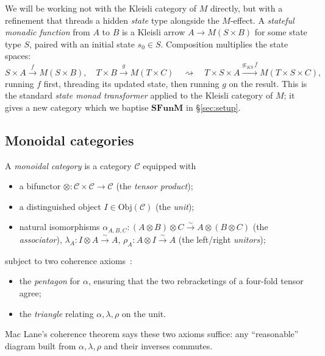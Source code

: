 \documentclass[11pt]{article}
\newcommand{\SFunM}{\mathbf{SFunM}}
\newcommand{\Obj}{\mathrm{Obj}}
\begin{document}
We will be working not with the Kleisli category of $M$ directly, but
with a refinement that threads a hidden \emph{state} type alongside
the $M$-effect.  A \emph{stateful monadic function} from $A$ to $B$ is
a Kleisli arrow $A \to M(S \times B)$ for some state type $S$, paired
with an initial state $s_0 \in S$.  Composition multiplies the state
spaces:
\[
  S \times A \xrightarrow{f} M(S \times B), \quad
  T \times B \xrightarrow{g} M(T \times C)
  \quad\rightsquigarrow\quad
  T \times S \times A \xrightarrow{g \mathbin{;}_{KS} f} M(T \times S \times C),
\]
running $f$ first, threading its updated state, then running $g$ on
the result.  This is the standard \emph{state monad transformer}
applied to the Kleisli category of $M$; it gives a new category which
we baptise $\SFunM$ in \S\ref{sec:setup}.

\subsection{Monoidal categories}
\label{sec:monoidal}

A \emph{monoidal category} is a category $\mathcal{C}$ equipped with
\begin{itemize}
  \item a bifunctor $\otimes : \mathcal{C} \times \mathcal{C} \to \mathcal{C}$
        (the \emph{tensor product});
  \item a distinguished object $I \in \Obj(\mathcal{C})$ (the
        \emph{unit});
  \item natural isomorphisms
        $\alpha_{A,B,C} : (A \otimes B) \otimes C \xrightarrow{\sim}
                          A \otimes (B \otimes C)$ (the
        \emph{associator}),
        $\lambda_A : I \otimes A \xrightarrow{\sim} A$,
        $\rho_A : A \otimes I \xrightarrow{\sim} A$ (the left/right
        \emph{unitors});
\end{itemize}
subject to two coherence axioms~\cite{MacLane63}:
\begin{itemize}
  \item the \emph{pentagon} for $\alpha$, ensuring that the two
        rebracketings of a four-fold tensor agree;
  \item the \emph{triangle} relating $\alpha, \lambda, \rho$ on the
        unit.
\end{itemize}
Mac Lane's coherence theorem says these two axioms suffice: any
``reasonable'' diagram built from $\alpha, \lambda, \rho$ and their
inverses commutes.
\end{document}
